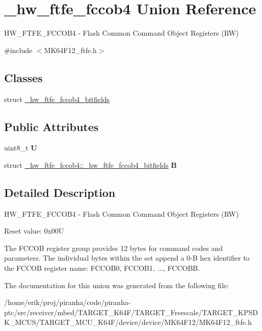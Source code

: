 \hypertarget{union__hw__ftfe__fccob4}{}\section{\+\_\+hw\+\_\+ftfe\+\_\+fccob4 Union Reference}
\label{union__hw__ftfe__fccob4}


H\+W\+\_\+\+F\+T\+F\+E\+\_\+\+F\+C\+C\+O\+B4 -\/ Flash Common Command Object Registers (RW)  




{\ttfamily \#include $<$M\+K64\+F12\+\_\+ftfe.\+h$>$}

\subsection*{Classes}
\begin{DoxyCompactItemize}
\item 
struct \hyperlink{struct__hw__ftfe__fccob4_1_1__hw__ftfe__fccob4__bitfields}{\+\_\+hw\+\_\+ftfe\+\_\+fccob4\+\_\+bitfields}
\end{DoxyCompactItemize}
\subsection*{Public Attributes}
\begin{DoxyCompactItemize}
\item 
uint8\+\_\+t {\bfseries U}\hypertarget{union__hw__ftfe__fccob4_a597638fffe218f3cc6ad690455ba7f30}{}\label{union__hw__ftfe__fccob4_a597638fffe218f3cc6ad690455ba7f30}

\item 
struct \hyperlink{struct__hw__ftfe__fccob4_1_1__hw__ftfe__fccob4__bitfields}{\+\_\+hw\+\_\+ftfe\+\_\+fccob4\+::\+\_\+hw\+\_\+ftfe\+\_\+fccob4\+\_\+bitfields} {\bfseries B}\hypertarget{union__hw__ftfe__fccob4_a88ed1244169cce77b70a004aa0b0d8c4}{}\label{union__hw__ftfe__fccob4_a88ed1244169cce77b70a004aa0b0d8c4}

\end{DoxyCompactItemize}


\subsection{Detailed Description}
H\+W\+\_\+\+F\+T\+F\+E\+\_\+\+F\+C\+C\+O\+B4 -\/ Flash Common Command Object Registers (RW) 

Reset value\+: 0x00U

The F\+C\+C\+OB register group provides 12 bytes for command codes and parameters. The individual bytes within the set append a 0-\/B hex identifier to the F\+C\+C\+OB register name\+: F\+C\+C\+O\+B0, F\+C\+C\+O\+B1, ..., F\+C\+C\+O\+BB. 

The documentation for this union was generated from the following file\+:\begin{DoxyCompactItemize}
\item 
/home/erik/proj/piranha/code/piranha-\/ptc/src/receiver/mbed/\+T\+A\+R\+G\+E\+T\+\_\+\+K64\+F/\+T\+A\+R\+G\+E\+T\+\_\+\+Freescale/\+T\+A\+R\+G\+E\+T\+\_\+\+K\+P\+S\+D\+K\+\_\+\+M\+C\+U\+S/\+T\+A\+R\+G\+E\+T\+\_\+\+M\+C\+U\+\_\+\+K64\+F/device/device/\+M\+K64\+F12/M\+K64\+F12\+\_\+ftfe.\+h\end{DoxyCompactItemize}
